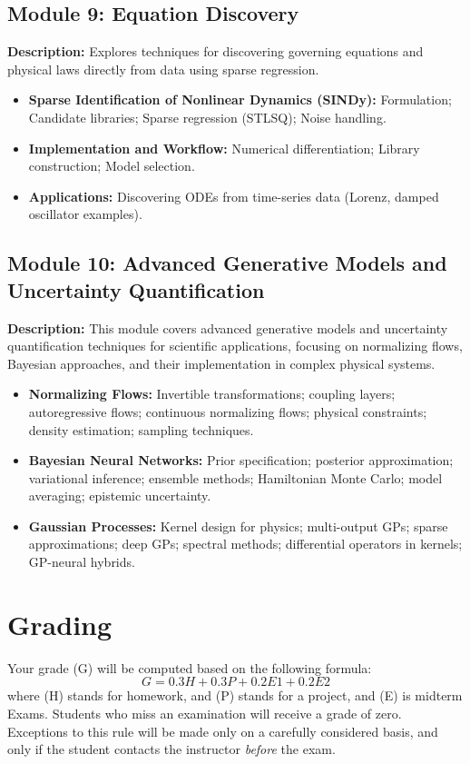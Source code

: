 \documentclass[11pt,fourier]{article}
\begin{document}
\subsection*{Module 9: Equation Discovery}
\textbf{Description:} Explores techniques for discovering governing equations and physical laws directly from data using sparse regression.
\begin{itemize}
    \item \textbf{Sparse Identification of Nonlinear Dynamics (SINDy):} Formulation; Candidate libraries; Sparse regression (STLSQ); Noise handling.
    \item \textbf{Implementation and Workflow:} Numerical differentiation; Library construction; Model selection.
    \item \textbf{Applications:} Discovering ODEs from time-series data (Lorenz, damped oscillator examples).
\end{itemize}

\subsection*{Module 10: Advanced Generative Models and Uncertainty Quantification}
\textbf{Description:} This module covers advanced generative models and uncertainty quantification techniques for scientific applications, focusing on normalizing flows, Bayesian approaches, and their implementation in complex physical systems.

\begin{itemize}
\item \textbf{Normalizing Flows:} Invertible transformations; coupling layers; autoregressive flows; continuous normalizing flows; physical constraints; density estimation; sampling techniques.

\item \textbf{Bayesian Neural Networks:} Prior specification; posterior approximation; variational inference; ensemble methods; Hamiltonian Monte Carlo; model averaging; epistemic uncertainty.

\item \textbf{Gaussian Processes:} Kernel design for physics; multi-output GPs; sparse approximations; deep GPs; spectral methods; differential operators in kernels; GP-neural hybrids.

\end{itemize}

\section*{Grading}
Your grade (G) will be computed based on the following formula:
\[ G = 0.3H + 0.3P + 0.2E1 + 0.2E2 \]
where (H) stands for homework, and (P) stands for a project, and (E) is midterm Exams. Students who miss an examination will receive a grade of zero. Exceptions to this rule will be made only on a carefully considered basis, and only if the student contacts the instructor \textit{before} the exam.
\end{document}

